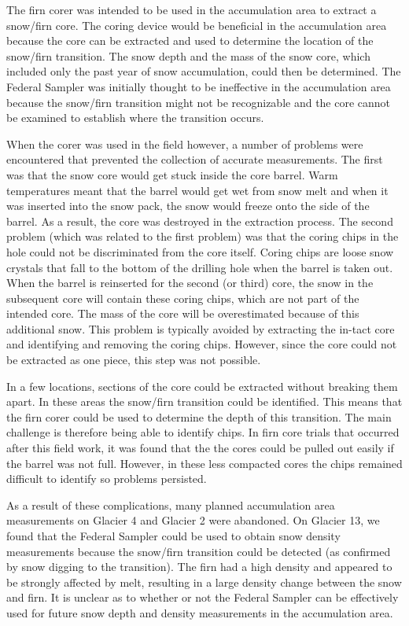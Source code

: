 \documentclass{sfuthesis}
\begin{document}
The firn corer was intended to be used in the accumulation area to extract a snow/firn core. The coring device would be beneficial in the accumulation area because the core can be extracted and used to determine the location of the snow/firn transition. The snow depth and the mass of the snow core, which included only the past year of snow accumulation, could then be determined. The Federal Sampler was initially thought to be ineffective in the accumulation area because the snow/firn transition might not be recognizable and the core cannot be examined to establish where the transition occurs.

When the corer was used in the field however, a number of problems were encountered that prevented the collection of accurate measurements. The first was that the snow core would get stuck inside the core barrel. Warm temperatures meant that the barrel would get wet from snow melt and when it was inserted into the snow pack, the snow would freeze onto the side of the barrel. As a result, the core was destroyed in the extraction process. The second problem (which was related to the first problem) was that the coring chips in the hole could not be discriminated from the core itself. Coring chips are loose snow crystals that fall to the bottom of the drilling hole when the barrel is taken out. When the barrel is reinserted for the second (or third) core, the snow in the subsequent core will contain these coring chips, which are not part of the intended core. The mass of the core will be overestimated because of this additional snow. This problem is typically avoided by extracting the in-tact core and identifying and removing the coring chips. However, since the core could not be extracted as one piece, this step was not possible. 

In a few locations, sections of the core could be extracted without breaking them apart. In these areas the snow/firn transition could be identified. This means that the firn corer could be used to determine the depth of this transition. The main challenge is therefore being able to identify chips. In firn core trials that occurred after this field work, it was found that the the cores could be pulled out easily if the barrel was not full. However, in these less compacted cores the chips remained difficult to identify so problems persisted. 

As a result of these complications, many planned accumulation area measurements on Glacier 4 and Glacier 2 were abandoned. On Glacier 13, we found that the Federal Sampler could be used to obtain snow density measurements because the snow/firn transition could be detected (as confirmed by snow digging to the transition). The firn had a high density and appeared to be strongly affected by melt, resulting in a large density change between the snow and firn. It is unclear as to whether or not the Federal Sampler can be effectively used for future snow depth and density measurements in the accumulation area.
\end{document}
